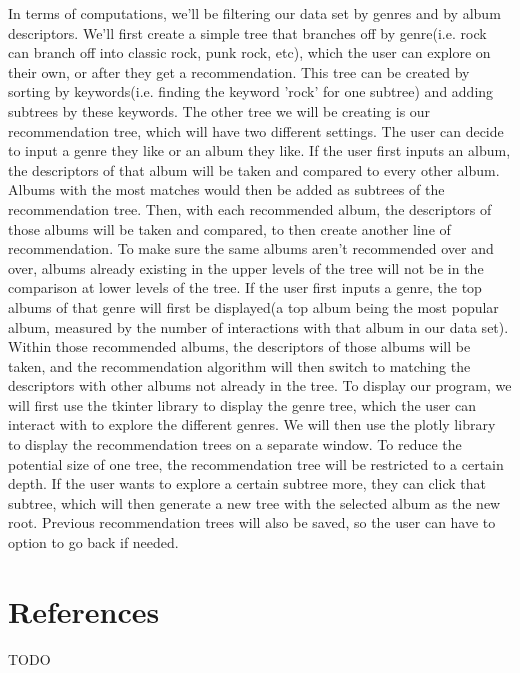 \documentclass[fontsize=11pt]{article}
\begin{document}
In terms of computations, we'll be filtering our data set by genres and by album descriptors. We'll first create a simple tree that branches off by genre(i.e. rock can branch off into classic rock, punk rock, etc), which the user can explore on their own, or after they get a recommendation. This tree can be created by sorting by keywords(i.e. finding the keyword 'rock' for one subtree) and adding subtrees by these keywords. The other tree we will be creating is our recommendation tree, which will have two different settings. The user can decide to input a genre they like or an album they like. If the user first inputs an album, the descriptors of that album will be taken and compared to every other album. Albums with the most matches would then be added as subtrees of the recommendation tree. Then, with each recommended album, the descriptors of those albums will be taken and compared, to then create another line of recommendation. To make sure the same albums aren't recommended over and over, albums already existing in the upper levels of the tree will not be in the comparison at lower levels of the tree. If the user first inputs a genre, the top albums of that genre will first be displayed(a top album being the most popular album, measured by the number of interactions with that album in our data set). Within those recommended albums, the descriptors of those albums will be taken, and the recommendation algorithm will then switch to matching the descriptors with other albums not already in the tree.
    To display our program, we will first use the tkinter library to display the genre tree, which the user can interact with to explore the different genres. We will then use the plotly library to display the recommendation trees on a separate window. To reduce the potential size of one tree, the recommendation tree will be restricted to a certain depth. If the user wants to explore a certain subtree more, they can click that subtree, which will then generate a new tree with the selected album as the new root. Previous recommendation trees will also be saved, so the user can have to option to go back if needed. 

\section*{References}

TODO

\end{document}
